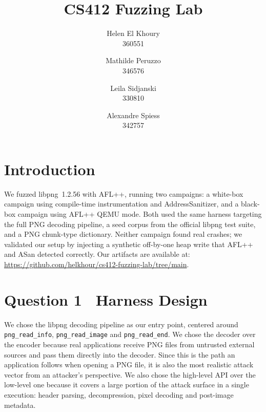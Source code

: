 \documentclass[letterpaper,twocolumn,10pt]{article}
\begin{document}
\date{}

\title{\Large \bf CS412 Fuzzing Lab}
\author{
{\rm Helen El Khoury}\\
360551
\and
{\rm Mathilde Peruzzo}\\
346576
\and
{\rm Leila Sidjanski}\\
330810
\and
{\rm Alexandre Spiess}\\
342757
}

\maketitle

\thispagestyle{empty}

\section*{Introduction}
We fuzzed libpng~1.2.56 with AFL++, running two campaigns: a white-box campaign using compile-time instrumentation and AddressSanitizer, and a black-box campaign using AFL++ QEMU mode. Both used the same harness targeting the full PNG decoding pipeline, a seed corpus from the official libpng test suite, and a PNG chunk-type dictionary. Neither campaign found real crashes; we validated our setup by injecting a synthetic off-by-one heap write that AFL++ and ASan detected correctly. Our artifacts are available at: \url{https://github.com/helkhour/cs412-fuzzing-lab/tree/main}.

\section{Question 1 \textendash\ Harness Design}
We chose the libpng decoding pipeline as our entry point, centered around \texttt{png\_read\_info}, \texttt{png\_read\_image} and \texttt{png\_read\_end}. We chose the decoder over the encoder because real applications receive PNG files from untrusted external sources and pass them directly into the decoder. Since this is the path an application follows when opening a PNG file, it is also the most realistic attack vector from an attacker's perspective. We also chose the high-level API over the low-level one because it covers a large portion of the attack surface in a single execution: header parsing, decompression, pixel decoding and post-image metadata. 
\end{document}
